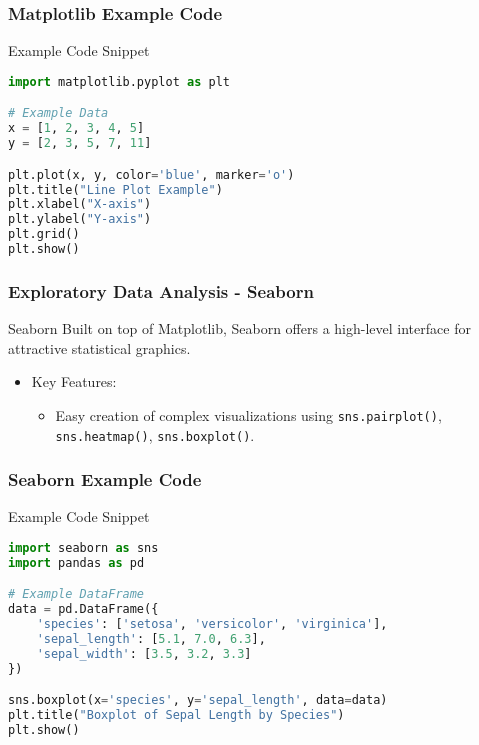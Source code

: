 \documentclass{beamer}
\begin{document}
\begin{frame}[fragile]
    \frametitle{Matplotlib Example Code}
    \begin{block}{Example Code Snippet}
        \begin{lstlisting}[language=Python]
import matplotlib.pyplot as plt

# Example Data
x = [1, 2, 3, 4, 5]
y = [2, 3, 5, 7, 11]

plt.plot(x, y, color='blue', marker='o')
plt.title("Line Plot Example")
plt.xlabel("X-axis")
plt.ylabel("Y-axis")
plt.grid()
plt.show()
        \end{lstlisting}
    \end{block}
\end{frame}

\begin{frame}[fragile]
    \frametitle{Exploratory Data Analysis - Seaborn}
    \begin{block}{Seaborn}
        Built on top of Matplotlib, Seaborn offers a high-level interface for attractive statistical graphics.
        \begin{itemize}
            \item Key Features:
            \begin{itemize}
                \item Easy creation of complex visualizations using \texttt{sns.pairplot()}, \texttt{sns.heatmap()}, \texttt{sns.boxplot()}.
            \end{itemize}
        \end{itemize}
    \end{block}
\end{frame}

\begin{frame}[fragile]
    \frametitle{Seaborn Example Code}
    \begin{block}{Example Code Snippet}
        \begin{lstlisting}[language=Python]
import seaborn as sns
import pandas as pd

# Example DataFrame
data = pd.DataFrame({
    'species': ['setosa', 'versicolor', 'virginica'],
    'sepal_length': [5.1, 7.0, 6.3],
    'sepal_width': [3.5, 3.2, 3.3]
})

sns.boxplot(x='species', y='sepal_length', data=data)
plt.title("Boxplot of Sepal Length by Species")
plt.show()
        \end{lstlisting}
    \end{block}
\end{frame}
\end{document}
